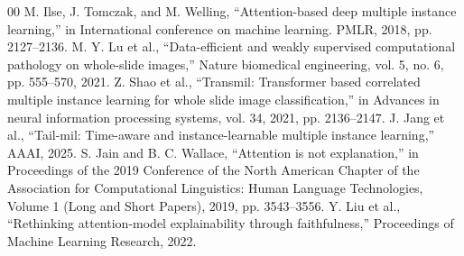 \documentclass[conference]{IEEEtran}
\begin{document}
\begin{thebibliography}{00}
 M. Ilse, J. Tomczak, and M. Welling, ``Attention-based deep multiple instance learning,'' in International conference on machine learning. PMLR, 2018, pp. 2127--2136.
 M. Y. Lu et al., ``Data-efficient and weakly supervised computational pathology on whole-slide images,'' Nature biomedical engineering, vol. 5, no. 6, pp. 555--570, 2021.
 Z. Shao et al., ``Transmil: Transformer based correlated multiple instance learning for whole slide image classification,'' in Advances in neural information processing systems, vol. 34, 2021, pp. 2136--2147.
 J. Jang et al., ``Tail-mil: Time-aware and instance-learnable multiple instance learning,'' AAAI, 2025.
 S. Jain and B. C. Wallace, ``Attention is not explanation,'' in Proceedings of the 2019 Conference of the North American Chapter of the Association for Computational Linguistics: Human Language Technologies, Volume 1 (Long and Short Papers), 2019, pp. 3543--3556.
 Y. Liu et al., ``Rethinking attention-model explainability through faithfulness,'' Proceedings of Machine Learning Research, 2022.
\end{thebibliography}
\end{document}
